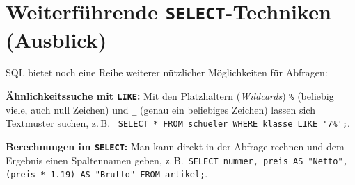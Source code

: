 \clearpage

\rehead[]{\textcolor{lightblue}{AvHG, Inf, My}}
\lohead[]{\textcolor{lightblue}{AvHG, Inf, My}}

\section{Weiterführende \texttt{SELECT}-Techniken (Ausblick)}

SQL bietet noch eine Reihe weiterer nützlicher Möglichkeiten für Abfragen:

\begin{compactitem}
  \item \textbf{Ähnlichkeitssuche mit \lstinline|LIKE|:} Mit den Platzhaltern
  (\emph{Wildcards}) \lstinline|%| (beliebig viele, auch null Zeichen) \linebreak 
  und \lstinline|_| (genau ein beliebiges Zeichen) lassen sich Textmuster suchen,
  z.\,B.\ \linebreak
  \lstinline|SELECT * FROM schueler WHERE klasse LIKE '7%';|.
  \item \textbf{Berechnungen im \lstinline|SELECT|:} Man kann direkt in der
  Abfrage rechnen und dem Ergebnis einen Spaltennamen geben, z.\,B.\
  \lstinline|SELECT nummer, preis AS "Netto", (preis * 1.19) AS "Brutto" FROM artikel;|.
\end{compactitem}
